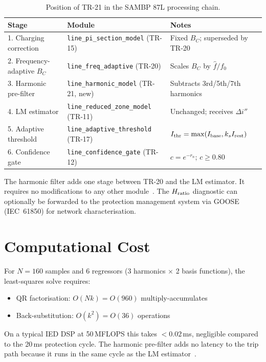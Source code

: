\documentclass[11pt, a4paper]{article}
\begin{document}
\begin{table}[h]
  \centering
  \caption{Position of TR-21 in the SAMBP 87L processing chain.}
  \label{tab:integration}
  \begin{tabular}{lll}
    \toprule
    Stage & Module & Notes \\
    \midrule
    1. Charging correction & \texttt{line\_pi\_section\_model} (TR-15) &
      Fixed $B_C$; superseded by TR-20 \\
    2. Frequency-adaptive $B_C$ & \texttt{line\_freq\_adaptive} (TR-20) &
      Scales $B_C$ by $\hat{f}/f_0$ \\
    3. Harmonic pre-filter & \texttt{line\_harmonic\_model} (TR-21, new) &
      Subtracts 3rd/5th/7th harmonics \\
    4. LM estimator & \texttt{line\_reduced\_zone\_model} (TR-11) &
      Unchanged; receives $\Delta i''$ \\
    5. Adaptive threshold & \texttt{line\_adaptive\_threshold} (TR-17) &
      $I_{\rm thr} = \max(I_{\rm base}, k_s I_{\rm rest})$ \\
    6. Confidence gate & \texttt{line\_confidence\_gate} (TR-12) &
      $c = e^{-r_n}$; $c \geq 0.80$ \\
    \bottomrule
  \end{tabular}
\end{table}

The harmonic filter adds one stage between TR-20 and the LM estimator.  It
requires no modifications to any other module~\cite{Blackburn2006}.  The
$H_{\rm ratio}$ diagnostic can optionally be forwarded to the protection
management system via GOOSE (IEC~61850) for network characterisation.


\section{Computational Cost}
\label{sec:cost}

For $N = 160$ samples and 6 regressors (3 harmonics $\times$ 2 basis
functions), the least-squares solve requires:
\begin{itemize}
  \item QR factorisation: $O(Nk) = O(960)$ multiply-accumulates
  \item Back-substitution: $O(k^2) = O(36)$ operations
\end{itemize}
On a typical IED DSP at 50\,MFLOPS this takes $< 0.02$\,ms, negligible
compared to the 20\,ms protection cycle.  The harmonic pre-filter adds no
latency to the trip path because it runs in the same cycle as the LM
estimator~\cite{IEC_61000_4_7}.
\end{document}
